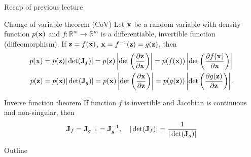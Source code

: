 \begin{frame}{Recap of previous lecture}
	\begin{block}{Change of variable theorem (CoV)}
		Let $\mathbf{x}$ be a random variable with density function $p(\mathbf{x})$ and $f: \mathbb{R}^m \rightarrow \mathbb{R}^m$ is a differentiable, invertible function (diffeomorphism). If $\mathbf{z} = f(\mathbf{x})$, $\mathbf{x} = f^{-1}(\mathbf{z}) = g(\mathbf{z})$, then
		\begin{align*}
			p(\mathbf{x}) &= p(\mathbf{z}) |\det(\mathbf{J}_f)| = p(\mathbf{z}) \left|\det \left(  \frac{\partial \mathbf{z}}{\partial \mathbf{x}} \right) \right| = p(f(\mathbf{x})) \left|\det \left(  \frac{\partial f(\mathbf{x})}{\partial \mathbf{x}} \right) \right| \\
			p(\mathbf{z}) &= p(\mathbf{x}) |\det(\mathbf{J}_g)|= p(\mathbf{x}) \left|\det \left(  \frac{\partial \mathbf{x}}{\partial \mathbf{z}} \right) \right| = p(g(\mathbf{z})) \left|\det \left(  \frac{\partial g(\mathbf{z})}{\partial \mathbf{z}} \right) \right|.
		\end{align*}
		\vspace{-0.5cm}
	\end{block}
	\begin{block}{Inverse function theorem}
		If function $f$ is invertible and Jacobian is continuous and non-singular, then
		\vspace{-0.3cm}
		\[
			\mathbf{J}_f = \mathbf{J}_{g^{-1}} = \mathbf{J}_g^{-1}, \quad |\det (\mathbf{J}_f)| = \frac{1}{|\det (\mathbf{J}_g)|}
		\]
		\vspace{-0.3cm}
	\end{block}
\end{frame}
\begin{frame}{Outline}
	\tableofcontents
\end{frame}

